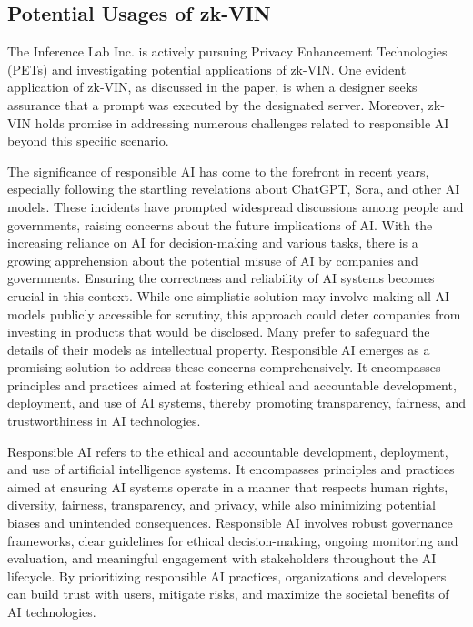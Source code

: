 \documentclass[conference]{IEEEtran}
\begin{document}
\subsection{Potential Usages of zk-VIN}

The Inference Lab Inc. is actively pursuing Privacy Enhancement Technologies (PETs) and investigating potential applications of zk-VIN. One evident application of zk-VIN, as discussed in the paper, is when a designer seeks assurance that a prompt was executed by the designated server. Moreover, zk-VIN holds promise in addressing numerous challenges related to responsible AI beyond this specific scenario.

The significance of responsible AI has come to the forefront in recent years, especially following the startling revelations about ChatGPT, Sora, and other AI models. These incidents have prompted widespread discussions among people and governments, raising concerns about the future implications of AI. With the increasing reliance on AI for decision-making and various tasks, there is a growing apprehension about the potential misuse of AI by companies and governments. Ensuring the correctness and reliability of AI systems becomes crucial in this context. While one simplistic solution may involve making all AI models publicly accessible for scrutiny, this approach could deter companies from investing in products that would be disclosed. Many prefer to safeguard the details of their models as intellectual property. Responsible AI emerges as a promising solution to address these concerns comprehensively. It encompasses principles and practices aimed at fostering ethical and accountable development, deployment, and use of AI systems, thereby promoting transparency, fairness, and trustworthiness in AI technologies.

Responsible AI refers to the ethical and accountable development, deployment, and use of artificial intelligence systems. It encompasses principles and practices aimed at ensuring AI systems operate in a manner that respects human rights, diversity, fairness, transparency, and privacy, while also minimizing potential biases and unintended consequences. Responsible AI involves robust governance frameworks, clear guidelines for ethical decision-making, ongoing monitoring and evaluation, and meaningful engagement with stakeholders throughout the AI lifecycle. By prioritizing responsible AI practices, organizations and developers can build trust with users, mitigate risks, and maximize the societal benefits of AI technologies.
\end{document}
